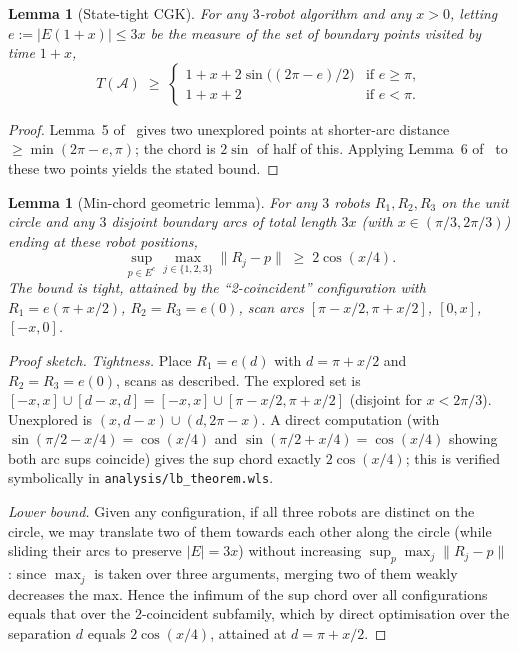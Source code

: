 \documentclass[11pt]{article}
\theoremstyle{plain}
\newtheorem{lemma}[theorem]{Lemma}
\theoremstyle{definition}
\theoremstyle{remark}
\begin{document}
\begin{lemma}[State-tight CGK]
\label{lem:state-cgk}
For any $3$-robot algorithm and any $x > 0$, letting $e := |E(1+x)|
\le 3x$ be the measure of the set of boundary points visited by time $1+x$,
\[
T(\mathcal A) \;\ge\; \begin{cases}
1 + x + 2\sin\bigl((2\pi - e)/2\bigr) & \text{if } e \ge \pi, \\
1 + x + 2 & \text{if } e < \pi.
\end{cases}
\]
\end{lemma}

\begin{proof}
Lemma~5 of~\cite{czyzowicz2014} gives two unexplored points at
shorter-arc distance $\ge \min(2\pi - e, \pi)$; the chord is $2\sin$ of
half of this. Applying Lemma~6 of~\cite{czyzowicz2014} to these two
points yields the stated bound.
\end{proof}

\begin{lemma}[Min-chord geometric lemma]
\label{lem:min-chord}
For any $3$ robots $R_1, R_2, R_3$ on the unit circle and any $3$
disjoint boundary arcs of total length $3x$ (with $x \in (\pi/3,
2\pi/3)$) ending at these robot positions,
\[
\sup_{p \in E^c} \max_{j \in \{1,2,3\}} \|R_j - p\|
\;\ge\; 2\cos(x/4).
\]
The bound is tight, attained by the ``2-coincident'' configuration with
$R_1 = e(\pi + x/2)$, $R_2 = R_3 = e(0)$, scan arcs $[\pi - x/2, \pi +
x/2]$, $[0, x]$, $[-x, 0]$.
\end{lemma}

\begin{proof}[Proof sketch]
\emph{Tightness.} Place $R_1 = e(d)$ with $d = \pi + x/2$ and $R_2 =
R_3 = e(0)$, scans as described. The explored set is $[-x, x] \cup [d -
x, d] = [-x, x] \cup [\pi - x/2, \pi + x/2]$ (disjoint for $x < 2\pi/3$).
Unexplored is $(x, d - x) \cup (d, 2\pi - x)$. A direct computation (with
$\sin(\pi/2 - x/4) = \cos(x/4)$ and $\sin(\pi/2 + x/4) = \cos(x/4)$
showing both arc sups coincide) gives the sup chord exactly $2\cos(x/4)$;
this is verified symbolically in \texttt{analysis/lb\_theorem.wls}.

\emph{Lower bound.} Given any configuration, if all three robots are
distinct on the circle, we may translate two of them towards each other
along the circle (while sliding their arcs to preserve $|E| = 3x$)
without increasing $\sup_p \max_j \|R_j - p\|$: since $\max_j$ is taken
over three arguments, merging two of them weakly decreases the max.
Hence the infimum of the sup chord over all configurations equals that
over the $2$-coincident subfamily, which by direct optimisation over the
separation $d$ equals $2\cos(x/4)$, attained at $d = \pi + x/2$.
\end{proof}
\end{document}
